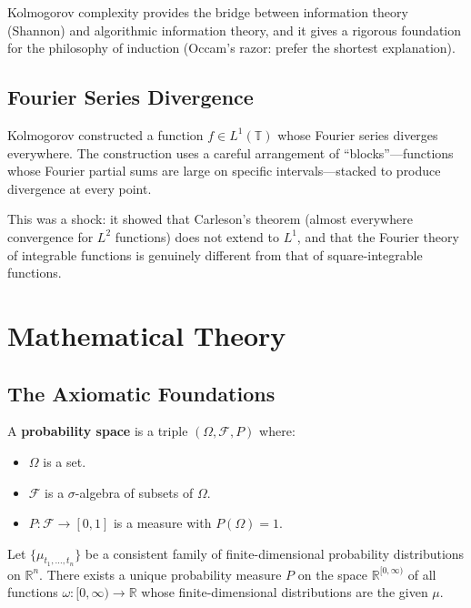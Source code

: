 Kolmogorov complexity provides the bridge between information theory (Shannon) and algorithmic information theory, and it gives a rigorous foundation for the philosophy of induction (Occam's razor: prefer the shortest explanation).

\subsection{Fourier Series Divergence}

Kolmogorov constructed a function $f \in L^1(\mathbb{T})$ whose Fourier series diverges everywhere. The construction uses a careful arrangement of ``blocks''---functions whose Fourier partial sums are large on specific intervals---stacked to produce divergence at every point.

This was a shock: it showed that Carleson's theorem (almost everywhere convergence for $L^2$ functions) does not extend to $L^1$, and that the Fourier theory of integrable functions is genuinely different from that of square-integrable functions.

\section{Mathematical Theory}

\subsection{The Axiomatic Foundations}

\begin{definition}
A \textbf{probability space} is a triple $(\Omega, \mathcal{F}, P)$ where:
\begin{itemize}
    \item $\Omega$ is a set.
    \item $\mathcal{F}$ is a $\sigma$-algebra of subsets of $\Omega$.
    \item $P: \mathcal{F} \to [0,1]$ is a measure with $P(\Omega) = 1$.
\end{itemize}
\end{definition}

\begin{theorem}
Let $\{\mu_{t_1,\dots,t_n}\}$ be a consistent family of finite-dimensional probability distributions on $\mathbb{R}^n$. There exists a unique probability measure $P$ on the space $\mathbb{R}^{[0,\infty)}$ of all functions $\omega: [0,\infty) \to \mathbb{R}$ whose finite-dimensional distributions are the given $\mu$.
\end{theorem}

